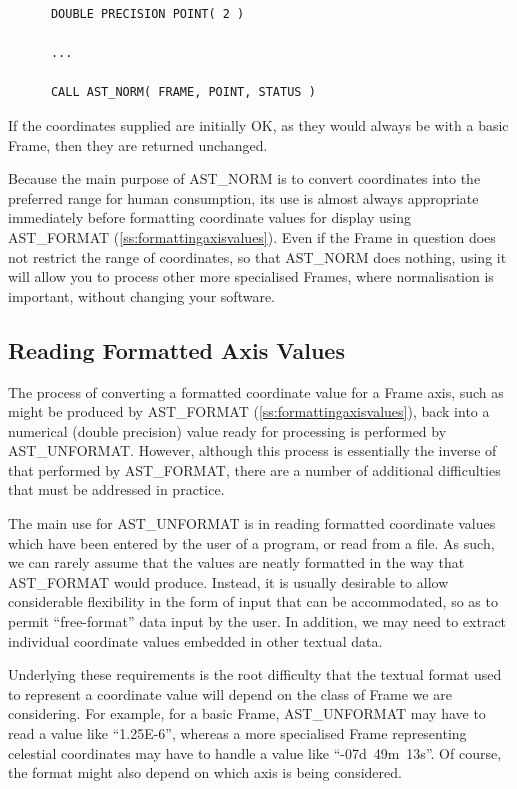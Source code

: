 \documentclass[twoside,11pt]{article}
\newcommand{\htmlref}[2]{#1}
\newcommand{\secref}[1]{\S\ref{#1}}
\renewcommand{\secref}[1]{\ref{#1}}
\begin{document}
\small
\begin{verbatim}
      DOUBLE PRECISION POINT( 2 )

      ...

      CALL AST_NORM( FRAME, POINT, STATUS )
\end{verbatim}
\normalsize

If the coordinates supplied are initially OK, as they would always be
with a basic Frame, then they are returned unchanged.

Because the main purpose of AST\_NORM is to convert coordinates into
the preferred range for human consumption, its use is almost always
appropriate immediately before formatting coordinate values for
display using \htmlref{AST\_FORMAT}{AST_FORMAT} (\secref{ss:formattingaxisvalues}). Even if
the Frame in question does not restrict the range of coordinates, so
that AST\_NORM does nothing, using it will allow you to process other
more specialised Frames, where normalisation is important, without
changing your software.

\subsection{\label{ss:unformattingaxisvalues}Reading Formatted Axis Values}

The process of converting a formatted coordinate value for a \htmlref{Frame}{Frame}
axis, such as might be produced by \htmlref{AST\_FORMAT}{AST_FORMAT}
(\secref{ss:formattingaxisvalues}), back into a numerical (double
precision) value ready for processing is performed by \htmlref{AST\_UNFORMAT}{AST_UNFORMAT}.
However, although this process is essentially the inverse of that
performed by AST\_FORMAT, there are a number of additional difficulties
that must be addressed in practice.

The main use for AST\_UNFORMAT is in reading formatted coordinate
values which have been entered by the user of a program, or read from
a file. As such, we can rarely assume that the values are neatly
formatted in the way that AST\_FORMAT would produce. Instead, it is
usually desirable to allow considerable flexibility in the form of
input that can be accommodated, so as to permit ``free-format'' data
input by the user. In addition, we may need to extract individual
coordinate values embedded in other textual data.

Underlying these requirements is the root difficulty that the textual
format used to represent a coordinate value will depend on the class
of Frame we are considering. For example, for a basic Frame,
AST\_UNFORMAT may have to read a value like ``1.25E-6'', whereas a
more specialised Frame representing celestial coordinates may have to
handle a value like ``-07d~49m~13s''. Of course, the format might also
depend on which axis is being considered.
\end{document}

